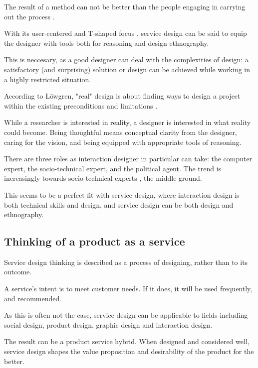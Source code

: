 The result of a method can not be better than the people engaging in carrying out the process \cite{lowgren}.

With its user-centered and T-shaped focus \cite{stickdorn}, service design can be said to equip the designer with tools both for reasoning and design ethnography.

This is neccesary, as a good designer can deal with the complexities of design: a satisfactory (and surprising) solution or design can be achieved while working in a highly restricted situation.

According to Löwgren, "real" design is about finding ways to design a project within the existing preconditions and limitations \cite{lowgren}.

While a researcher is interested in reality, a designer is interested in what reality could become. \cite{lowgren} Being thoughtful means conceptual clarity from the designer, caring for the vision, and being equipped with appropriate tools of reasoning.

There are three roles as interaction designer in particular can take: the computer expert, the socio-technical expert, and the political agent. The trend is increasingly towards socio-technical experts \cite{lowgren}, the middle ground.

This seems to be a perfect fit with service design, where interaction design is both technical skills and design, and service design can be both design and ethnography.

\subsection{Thinking of a product as a service}

Service design thinking is described as a process of designing, rather than to its outcome.

A service's intent is to meet customer needs. If it does, it will be used frequently, and recommended. \cite{stickdorn}

As this is often not the case, service design can be applicable to fields including social design, product design, graphic design and interaction design.

The result can be a product service hybrid. When designed and considered well, service design shapes the value proposition and desirability of the product for the better.



